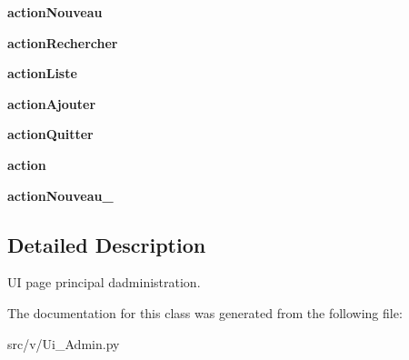 \begin{DoxyCompactItemize}
\item 
\hypertarget{classsrc_1_1v_1_1_ui___admin_1_1_ui___main_window_a510e027cf6d376445fdf7c3762619f1e}{}{\bfseries action\+Nouveau}\label{classsrc_1_1v_1_1_ui___admin_1_1_ui___main_window_a510e027cf6d376445fdf7c3762619f1e}

\item 
\hypertarget{classsrc_1_1v_1_1_ui___admin_1_1_ui___main_window_a0e55816c19ad869c9a312936c0e33b2b}{}{\bfseries action\+Rechercher}\label{classsrc_1_1v_1_1_ui___admin_1_1_ui___main_window_a0e55816c19ad869c9a312936c0e33b2b}

\item 
\hypertarget{classsrc_1_1v_1_1_ui___admin_1_1_ui___main_window_aae4991bae48cf7da6fa203ca8c7feeb6}{}{\bfseries action\+Liste}\label{classsrc_1_1v_1_1_ui___admin_1_1_ui___main_window_aae4991bae48cf7da6fa203ca8c7feeb6}

\item 
\hypertarget{classsrc_1_1v_1_1_ui___admin_1_1_ui___main_window_a7f05ccf6aa071fad20e2b48c3881b033}{}{\bfseries action\+Ajouter}\label{classsrc_1_1v_1_1_ui___admin_1_1_ui___main_window_a7f05ccf6aa071fad20e2b48c3881b033}

\item 
\hypertarget{classsrc_1_1v_1_1_ui___admin_1_1_ui___main_window_a3223c746ed52b1ffc484918dd4172aaa}{}{\bfseries action\+Quitter}\label{classsrc_1_1v_1_1_ui___admin_1_1_ui___main_window_a3223c746ed52b1ffc484918dd4172aaa}

\item 
\hypertarget{classsrc_1_1v_1_1_ui___admin_1_1_ui___main_window_a2d5e356c7228d633c5188a171f017ead}{}{\bfseries action}\label{classsrc_1_1v_1_1_ui___admin_1_1_ui___main_window_a2d5e356c7228d633c5188a171f017ead}

\item 
\hypertarget{classsrc_1_1v_1_1_ui___admin_1_1_ui___main_window_ae2aab5119d7ec5f985dd86c5097b63f9}{}{\bfseries action\+Nouveau\+\_}\label{classsrc_1_1v_1_1_ui___admin_1_1_ui___main_window_ae2aab5119d7ec5f985dd86c5097b63f9}

\end{DoxyCompactItemize}


\subsection{Detailed Description}
U\+I page principal d\textquotesingle{}administration. 

The documentation for this class was generated from the following file\+:\begin{DoxyCompactItemize}
\item 
src/v/Ui\+\_\+\+Admin.\+py\end{DoxyCompactItemize}
